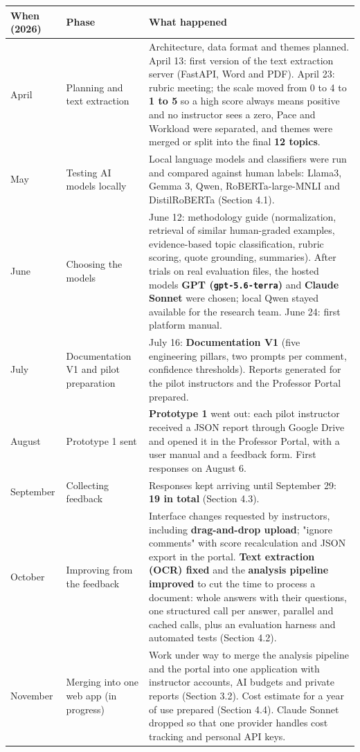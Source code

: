 \documentclass[
  11pt,
]{article}
\newcounter{none} %
\begin{document}
{\def\LTcaptype{none} %
\begin{longtable}[]{@{}lll@{}}
\toprule\noalign{}
When (2026) & Phase & What happened \\
\midrule\noalign{}
\endhead
\bottomrule\noalign{}
\endlastfoot
April & Planning and text extraction & Architecture, data format and themes
planned. April 13: first version of the text extraction server (FastAPI, Word
and PDF). April 23: rubric meeting; the scale moved from 0 to 4 to \textbf{1 to
5} so a high score always means positive and no instructor sees a zero, Pace and
Workload were separated, and themes were merged or split into the final
\textbf{12 topics}. \\
May & Testing AI models locally & Local language models and classifiers were run
and compared against human labels: Llama3, Gemma 3, Qwen, RoBERTa-large-MNLI and
DistilRoBERTa (Section 4.1). \\
June & Choosing the models & June 12: methodology guide (normalization,
retrieval of similar human-graded examples, evidence-based topic classification,
rubric scoring, quote grounding, summaries). After trials on real evaluation
files, the hosted models \textbf{GPT (\texttt{gpt-5.6-terra})} and
\textbf{Claude Sonnet} were chosen; local Qwen stayed available for the research
team. June 24: first platform manual. \\
July & Documentation V1 and pilot preparation & July 16: \textbf{Documentation
V1} (five engineering pillars, two prompts per comment, confidence thresholds).
Reports generated for the pilot instructors and the Professor Portal
prepared. \\
August & Prototype 1 sent & \textbf{Prototype 1} went out: each pilot instructor
received a JSON report through Google Drive and opened it in the Professor
Portal, with a user manual and a feedback form. First responses on August 6. \\
September & Collecting feedback & Responses kept arriving until September 29:
\textbf{19 in total} (Section 4.3). \\
October & Improving from the feedback & Interface changes requested by
instructors, including \textbf{drag-and-drop upload}; "ignore comments" with
score recalculation and JSON export in the portal. \textbf{Text extraction (OCR)
fixed} and the \textbf{analysis pipeline improved} to cut the time to process a
document: whole answers with their questions, one structured call per answer,
parallel and cached calls, plus an evaluation harness and automated tests
(Section 4.2). \\
November & Merging into one web app (in progress) & Work under way to merge the
analysis pipeline and the portal into one application with instructor accounts,
AI budgets and private reports (Section 3.2). Cost estimate for a year of use
prepared (Section 4.4). Claude Sonnet dropped so that one provider handles cost
tracking and personal API keys. \\
\end{longtable}
}
\end{document}
